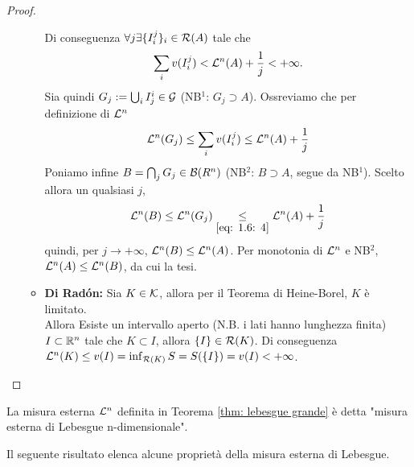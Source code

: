 \begin{proof}
\begin{enumerate}[label=\textbf{\Large\arabic*.}, ref=\textbf{\underline{(\arabic*)}}]
\begin{itemize}
            Di conseguenza $\forall j \exists \{I_i^j\}_i\in \mathcal{R}(A)$ tale che 
            \[\sum_iv(I_i^j)<\mathcal{L}^n(A)+\frac{1}{j}<+\infty.\]
            Sia quindi $G_j:=\bigcup_iI_j^i\in \mathcal{G}$ (NB$^1$: $G_j\supset A$). Ossreviamo che per definizione di $\mathcal{L}^n$ 
            \begin{equation}\label{eq: 1.6: 4}
                \mathcal{L}^n(G_j)\leq \sum_iv(I_i^j)\leq \mathcal{L}^n(A)+\frac{1}{j}
            \end{equation}
            Poniamo infine $B=\bigcap_jG_j\in \mathcal{B}(R^n)$ (NB$^2$: $B\supset A$, segue da NB$^1$). Scelto allora un qualsiasi $j$,
            \[\mathcal{L}^n(B)\leq \mathcal{L}^n(G_j)\underset{\eqref{eq: 1.6: 4}}{\leq} \mathcal{L}^n(A)+\frac{1}{j}\]
            quindi, per $j\to+\infty$, $\mathcal{L}^n(B)\leq \mathcal{L}^n(A)$. Per monotonia di $\mathcal{L}^n$ e NB$^2$, $\mathcal{L}^n(A)\leq \mathcal{L}^n(B)$, da cui la tesi.
            \item \textbf{Di Radón:} 
            Sia $K\in \mathcal{K}$, allora per il Teorema di Heine-Borel, $K$ è limitato. \hspace{\fill}\\
            Allora Esiste un intervallo aperto (N.B. i lati hanno lunghezza finita) $I\subset \mathbb{R}^n$ tale che $K\subset I$, allora $\{I\}\in \mathcal{R}(K)$. Di conseguenza $\mathcal{L}^n(K)\leq v(I)=\inf_{\mathcal{R}(K)}S=S(\{I\})=v(I)<+\infty$.
            \qedhere
        \end{itemize}
    \end{enumerate}
\end{proof}

\begin{definition}
  La misura esterna $\mathcal{L}^{n}$ definita in Teorema \ref{thm: lebesgue grande} è detta "misura esterna di Lebesgue n-dimensionale".
\end{definition}
Il seguente risultato elenca alcune proprietà della misura esterna di Lebesgue.


